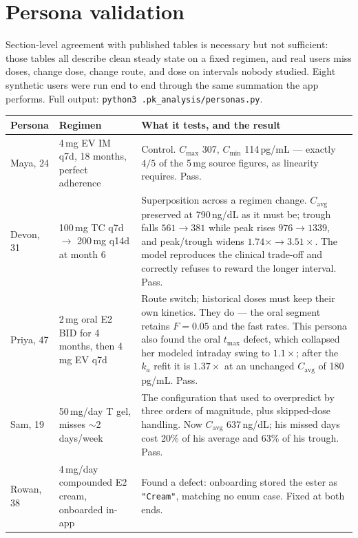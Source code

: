 \documentclass[11pt,a4paper]{article}
\newcommand{\good}[1]{\textcolor{ok}{#1}}
\newcommand{\code}[1]{\texttt{\small #1}}
\begin{document}
\section{Persona validation}

Section-level agreement with published tables is necessary but not sufficient:
those tables all describe clean steady state on a fixed regimen, and real users
miss doses, change dose, change route, and dose on intervals nobody studied.
Eight synthetic users were run end to end through the same summation the app
performs. Full output: \code{python3 .pk\_analysis/personas.py}.

\begin{longtable}{@{}p{2.6cm}p{4.5cm}p{7.4cm}@{}}
\toprule
\textbf{Persona} & \textbf{Regimen} & \textbf{What it tests, and the result} \\
\midrule
\endhead
Maya, 24 & 4\,mg EV IM q7d, 18 months, perfect adherence
 & Control. $C_{\max}$ 307, $C_{\min}$ 114\,pg/mL --- exactly $4/5$ of the 5\,mg
   source figures, as linearity requires. \good{Pass.} \\[0.4em]
Devon, 31 & 100\,mg TC q7d $\to$ 200\,mg q14d at month 6
 & Superposition across a regimen change. $C_{\mathrm{avg}}$ preserved at
   790\,ng/dL as it must be; trough falls $561 \to 381$ while peak rises
   $976 \to 1339$, and peak/trough widens $1.74\times \to 3.51\times$. The model
   reproduces the clinical trade-off and correctly refuses to reward the longer
   interval. \good{Pass.} \\[0.4em]
Priya, 47 & 2\,mg oral E2 BID for 4 months, then 4\,mg EV q7d
 & Route switch; historical doses must keep their own kinetics. They do --- the
   oral segment retains $F = 0.05$ and the fast rates. This persona also found the
   oral $t_{\max}$ defect, which collapsed her modeled intraday swing to
   $1.1\times$; after the $k_a$ refit it is $1.37\times$ at an unchanged
   $C_{\mathrm{avg}}$ of 180\,pg/mL. \good{Pass.} \\[0.4em]
Sam, 19 & 50\,mg/day T gel, misses $\sim$2 days/week
 & The configuration that used to overpredict by three orders of magnitude, plus
   skipped-dose handling. Now $C_{\mathrm{avg}}$ 637\,ng/dL; his missed days cost
   20\% of his average and 63\% of his trough. \good{Pass.} \\[0.4em]
Rowan, 38 & 4\,mg/day compounded E2 cream, onboarded in-app
 & Found a defect: onboarding stored the ester as \code{"Cream"}, matching no
   enum case. \good{Fixed at both ends.} \\[0.4em]

\end{longtable}
\end{document}
